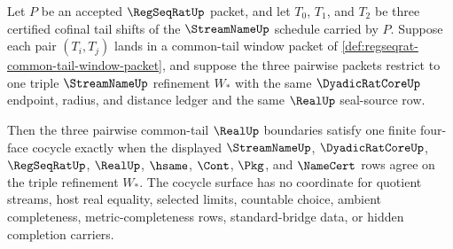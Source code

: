 \begin{theorem}
\label{thm:regseqrat-common-tail-four-face-cocycle-determinacy}
Let $P$ be an accepted $\RegSeqRatUp$ packet, and let $T_0$, $T_1$, and $T_2$ be three certified cofinal tail shifts of the $\StreamNameUp$ schedule carried by $P$. Suppose each pair $(T_i,T_j)$ lands in a common-tail window packet of \autoref{def:regseqrat-common-tail-window-packet}, and suppose the three pairwise packets restrict to one triple $\StreamNameUp$ refinement $W_\ast$ with the same $\DyadicRatCoreUp$ endpoint, radius, and distance ledger and the same $\RealUp$ seal-source row.

Then the three pairwise common-tail $\RealUp$ boundaries satisfy one finite four-face cocycle exactly when the displayed $\StreamNameUp$, $\DyadicRatCoreUp$, $\RegSeqRatUp$, $\RealUp$, $\hsame$, $\Cont$, $\Pkg$, and $\NameCert$ rows agree on the triple refinement $W_\ast$. The cocycle surface has no coordinate for quotient streams, host real equality, selected limits, countable choice, ambient completeness, metric-completeness rows, standard-bridge data, or hidden completion carriers.
\end{theorem}
